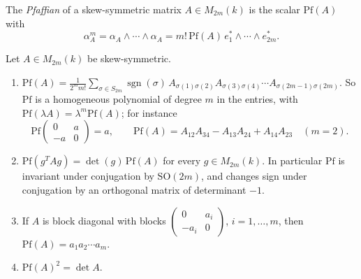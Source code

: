 \begin{definition}\label{multilinear-algebra:definition-pfaffian}
The \emph{Pfaffian} of a skew-symmetric matrix $A \in M_{2m}(k)$ is the scalar $\mathrm{Pf}(A)$ with
\[
\alpha_A^m = \alpha_A \wedge \cdots \wedge \alpha_A = m!\,\mathrm{Pf}(A)\,e_1^* \wedge \cdots \wedge e_{2m}^* .
\]
\end{definition}

\begin{proposition}\label{multilinear-algebra:proposition-pfaffian}
Let $A \in M_{2m}(k)$ be skew-symmetric.
\begin{enumerate}
\item $\displaystyle\mathrm{Pf}(A) = \frac{1}{2^mm!}\sum_{\sigma \in S_{2m}}\operatorname{sgn}(\sigma)\,A_{\sigma(1)\sigma(2)}A_{\sigma(3)\sigma(4)} \cdots A_{\sigma(2m-1)\sigma(2m)}$. So $\mathrm{Pf}$ is a
homogeneous polynomial of degree $m$ in the entries, with $\mathrm{Pf}(\lambda A) = \lambda^m\mathrm{Pf}(A)$; for instance
\[
\mathrm{Pf}\begin{pmatrix} 0 & a\\ -a & 0\end{pmatrix} = a, \qquad \mathrm{Pf}(A) = A_{12}A_{34} - A_{13}A_{24} + A_{14}A_{23} \quad (m = 2).
\]
\item $\mathrm{Pf}(g^TAg) = \det(g)\,\mathrm{Pf}(A)$ for every $g \in M_{2m}(k)$. In particular $\mathrm{Pf}$ is invariant under conjugation by $\mathrm{SO}(2m)$, and changes sign under
conjugation by an orthogonal matrix of determinant $-1$.
\item If $A$ is block diagonal with blocks $\begin{pmatrix} 0 & a_i\\ -a_i & 0\end{pmatrix}$, $i = 1, \ldots, m$, then $\mathrm{Pf}(A) = a_1a_2 \cdots a_m$.
\item $\mathrm{Pf}(A)^2 = \det A$.
\end{enumerate}
\end{proposition}

